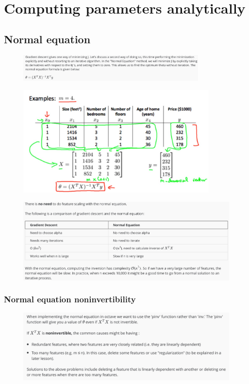 \documentclass[12pt, A4,onecolumn]{article} %
\begin{document}
\section{Computing parameters analytically}
\subsection{Normal equation}
\begin{figure}[H]
	\centering
	\includegraphics[width=0.85\textwidth]{./Imagenes/normalEq1}
\end{figure}
\begin{figure}[H]
	\centering
	\includegraphics[width=0.9\textwidth]{./Imagenes/normalEq2}
\end{figure}
\begin{figure}[H]
	\centering
	\includegraphics[width=1\textwidth]{./Imagenes/normalEq3}
\end{figure}

\subsubsection{Normal equation noninvertibility}
\begin{figure}[H]
	\centering
	\includegraphics[width=1\textwidth]{./Imagenes/normalEq4}
\end{figure}
\end{document}

